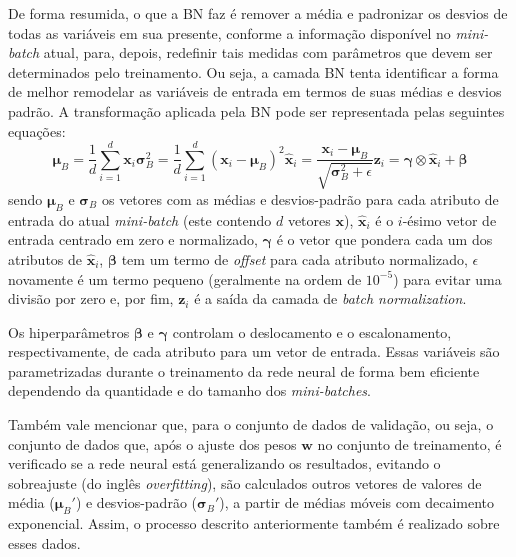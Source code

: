 \documentclass[a4paper, 12pt]{article}
\begin{document}
De forma resumida, o que a BN faz é remover a média e padronizar os desvios de todas as variáveis em sua presente, conforme a informação disponível no \textit{mini-batch} atual, para, depois, redefinir tais medidas com parâmetros que devem ser determinados pelo treinamento. Ou seja, a camada BN tenta identificar a forma de melhor remodelar as variáveis de entrada em termos de suas médias e desvios padrão. A transformação aplicada pela BN pode ser representada pelas seguintes equações: 
\begin{subequations}
\begin{equation}\label{eq:bn-1}
 \boldsymbol{\mu}_{B} = \frac{1}{d} \sum_{i=1}^{d} \mathbf{x}_{i} 
\end{equation}
\begin{equation}\label{eq:bn-2}
\boldsymbol{\sigma}_{B}^{2} = \frac{1}{d} \sum_{i=1}^{d} (\mathbf{x}_{i} - \boldsymbol{\mu}_{B})^2 
\end{equation}
\begin{equation}\label{eq:bn-3}
\hat{\mathbf{x}}_{i} = \frac{\mathbf{x}_{i} - \boldsymbol{\mu}_{B}}{\sqrt{\boldsymbol{\sigma}_{B}^2 + \epsilon}}
\end{equation}
\begin{equation}\label{eq:bn-4}
\mathbf{z}_{i} = \boldsymbol{\gamma} \otimes \hat{\mathbf{x}}_{i} + \boldsymbol{\beta}
\end{equation}
\end{subequations}
sendo $\boldsymbol{\mu}_{B}$ e $\boldsymbol{\sigma}_{B}$ os vetores com as médias e desvios-padrão para cada atributo de entrada do atual \textit{mini-batch} (este contendo $d$ vetores $\mathbf{x}$), $\hat{\mathbf{x}}_{i}$ é o $i$-ésimo vetor de entrada centrado em zero e normalizado, $\boldsymbol{\gamma}$ é o vetor que pondera cada um dos atributos de $\hat{\mathbf{x}}_{i}$, $\boldsymbol{\beta}$ tem um termo de \textit{offset} para cada atributo normalizado, $\epsilon$ novamente é um termo pequeno (geralmente na ordem de $10^{-5}$) para evitar uma divisão por zero e, por fim, $\mathbf{z}_{i}$ é a saída da camada de \textit{batch normalization}.

Os hiperparâmetros $\boldsymbol{\beta}$ e $\boldsymbol{\gamma}$ controlam o deslocamento e o escalonamento, respectivamente, de cada atributo para um vetor de entrada. Essas variáveis são parametrizadas durante o treinamento da rede neural de forma bem eficiente dependendo da quantidade e do tamanho dos \textit{mini-batches}. 

Também vale mencionar que, para o conjunto de dados de validação, ou seja, o conjunto de dados que, após o ajuste dos pesos $\mathbf{w}$ no conjunto de treinamento, é verificado se a rede neural está generalizando os resultados, evitando o sobreajuste (do inglês \textit{overfitting}), são calculados outros vetores de valores de média ($\boldsymbol{\mu}_{B}'$) e desvios-padrão ($\boldsymbol{\sigma}_{B}'$), a partir de médias móveis com decaimento exponencial. Assim, o processo descrito anteriormente também é realizado sobre esses dados.
\end{document}
